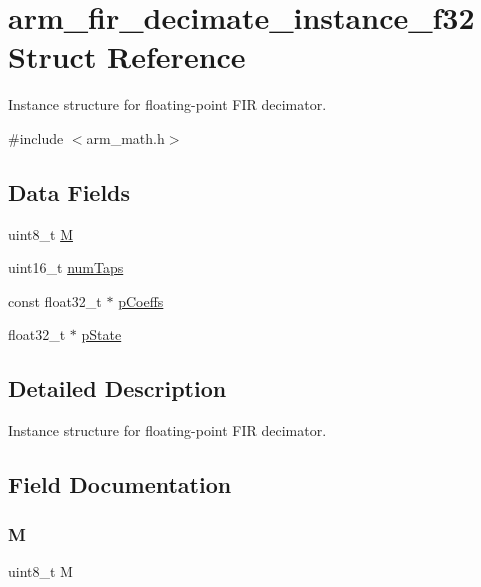 \hypertarget{structarm__fir__decimate__instance__f32}{}\section{arm\+\_\+fir\+\_\+decimate\+\_\+instance\+\_\+f32 Struct Reference}
\label{structarm__fir__decimate__instance__f32}


Instance structure for floating-\/point F\+IR decimator.  




{\ttfamily \#include $<$arm\+\_\+math.\+h$>$}

\subsection*{Data Fields}
\begin{DoxyCompactItemize}
\item 
uint8\+\_\+t \mbox{\hyperlink{structarm__fir__decimate__instance__f32_ae2c8107d00d3c9942e7a20fc598edecf}{M}}
\item 
uint16\+\_\+t \mbox{\hyperlink{structarm__fir__decimate__instance__f32_a751941891e47f522a7f5375fe8990aac}{num\+Taps}}
\item 
const float32\+\_\+t $\ast$ \mbox{\hyperlink{structarm__fir__decimate__instance__f32_a39230f04a29d8321948e339633780442}{p\+Coeffs}}
\item 
float32\+\_\+t $\ast$ \mbox{\hyperlink{structarm__fir__decimate__instance__f32_a335c87e6fdc4b96601d95a5de8b9c463}{p\+State}}
\end{DoxyCompactItemize}


\subsection{Detailed Description}
Instance structure for floating-\/point F\+IR decimator. 

\subsection{Field Documentation}
\mbox{\label{structarm__fir__decimate__instance__f32_ae2c8107d00d3c9942e7a20fc598edecf}} 
\subsubsection{\texorpdfstring{M}{M}}
{\footnotesize\ttfamily uint8\+\_\+t M}

